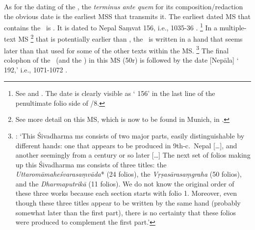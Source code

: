 \medskip
As for the dating of the \VSS,
the \textit{terminus ante quem} for its
composition\thinspace /\thinspace redaction
the obvious date is the earliest MSS that transmits it.
The earliest dated MS that contains the \VSS\ is \msKoa. 
It is dated to Nepal Saṃvat 156, i.e., 1035-36 \CE.%
	\footnote{See  and
		. The date
	 	is clearly visible as ` 156' 
	 	in the last line of the penultimate folio side 
	 	of \msKoa/8.}
In a multiple-text MS%
	\footnote{See more detail on this MS, which is
						now to be found in Munich, in	
					    .}
that is potentially earlier than \msKoa,
the \VSS\ is written in a hand that seems later than
that used for some of the other texts within the MS.%
		\footnote{:
		`This Śivadharma ms consists 
		of two major parts, easily distinguishable by different 		
		hands: one that appears to be produced in
		9th-c.\ Nepal [\dots], and another seemingly from 
		a century or so later [\dots] 
		The next set of folios making up this Śivadharma ms 	
		consists of three titles: the 
		\textit{Uttaromāmaheśvarasaṃvāda}* (24 folios), 
		the \textit{Vṛṣasārasaṃgraha} (50 folios), and the
		\textit{Dharmaputrikā} (11 folios). We do
		not know the original order of these three works 
		because each section starts with folio 1. Moreover, even 
		though these three titles appear to be written by the same 
		hand (probably somewhat later than the ﬁrst part), there 
		is no certainty that these folios were produced to 	
		complement the ﬁrst part.'}
The final colophon of the \VSS\ (and the \DHARMP) in
this MS  (\fol50r) is followed by the date
[Nepāla] ` 192,' i.e., 1071-1072 \CE.

